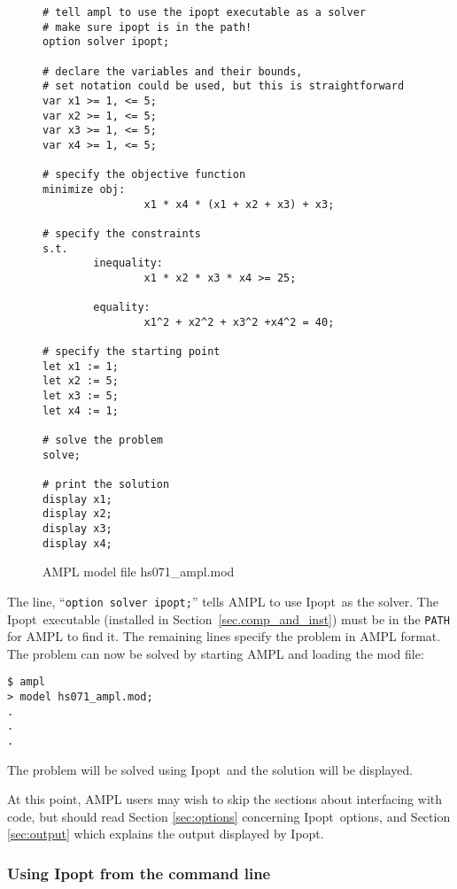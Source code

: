 \documentclass[10pt]{article}
\newcommand{\Ipopt}{{\sc Ipopt}}
\begin{document}
\begin{figure}
  \centering
\begin{footnotesize}
\begin{verbatim}
# tell ampl to use the ipopt executable as a solver
# make sure ipopt is in the path!
option solver ipopt;

# declare the variables and their bounds, 
# set notation could be used, but this is straightforward
var x1 >= 1, <= 5; 
var x2 >= 1, <= 5; 
var x3 >= 1, <= 5; 
var x4 >= 1, <= 5;

# specify the objective function
minimize obj:
                x1 * x4 * (x1 + x2 + x3) + x3;
        
# specify the constraints
s.t.
        inequality:
                x1 * x2 * x3 * x4 >= 25;
                
        equality:
                x1^2 + x2^2 + x3^2 +x4^2 = 40;

# specify the starting point            
let x1 := 1;
let x2 := 5;
let x3 := 5;
let x4 := 1;

# solve the problem
solve;

# print the solution
display x1;
display x2;
display x3;
display x4;
\end{verbatim}
\end{footnotesize}
  
  \caption{AMPL model file hs071\_ampl.mod}
  \label{fig:HS71}
\end{figure}

The line, ``{\tt option solver ipopt;}'' tells AMPL to use \Ipopt\ as
the solver. The \Ipopt\ executable (installed in
Section~\ref{sec.comp_and_inst}) must be in the {\tt PATH} for AMPL to
find it. The remaining lines specify the problem in AMPL format. The
problem can now be solved by starting AMPL and loading the mod file:
\begin{verbatim}
$ ampl
> model hs071_ampl.mod;
.
.
.
\end{verbatim}
The problem will be solved using \Ipopt\ and the solution will be
displayed.

At this point, AMPL users may wish to skip the sections about
interfacing with code, but should read Section \ref{sec:options}
concerning \Ipopt\ options, and Section \ref{sec:output} which
explains the output displayed by \Ipopt.

\subsubsection{Using Ipopt from the command line}
\end{document}
